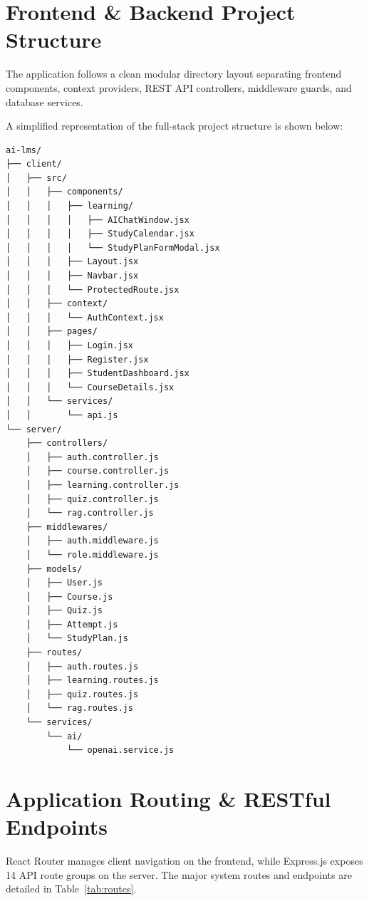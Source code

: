 \section{Frontend \& Backend Project Structure}

The application follows a clean modular directory layout separating frontend components, context providers, REST API controllers, middleware guards, and database services.

A simplified representation of the full-stack project structure is shown below:

\begin{verbatim}
ai-lms/
├── client/
│   ├── src/
│   │   ├── components/
│   │   │   ├── learning/
│   │   │   │   ├── AIChatWindow.jsx
│   │   │   │   ├── StudyCalendar.jsx
│   │   │   │   └── StudyPlanFormModal.jsx
│   │   │   ├── Layout.jsx
│   │   │   ├── Navbar.jsx
│   │   │   └── ProtectedRoute.jsx
│   │   ├── context/
│   │   │   └── AuthContext.jsx
│   │   ├── pages/
│   │   │   ├── Login.jsx
│   │   │   ├── Register.jsx
│   │   │   ├── StudentDashboard.jsx
│   │   │   └── CourseDetails.jsx
│   │   └── services/
│   │       └── api.js
└── server/
    ├── controllers/
    │   ├── auth.controller.js
    │   ├── course.controller.js
    │   ├── learning.controller.js
    │   ├── quiz.controller.js
    │   └── rag.controller.js
    ├── middlewares/
    │   ├── auth.middleware.js
    │   └── role.middleware.js
    ├── models/
    │   ├── User.js
    │   ├── Course.js
    │   ├── Quiz.js
    │   ├── Attempt.js
    │   └── StudyPlan.js
    ├── routes/
    │   ├── auth.routes.js
    │   ├── learning.routes.js
    │   ├── quiz.routes.js
    │   └── rag.routes.js
    └── services/
        └── ai/
            └── openai.service.js
\end{verbatim}

\section{Application Routing \& RESTful Endpoints}

React Router manages client navigation on the frontend, while Express.js exposes 14 API route groups on the server. The major system routes and endpoints are detailed in Table~\ref{tab:routes}.

